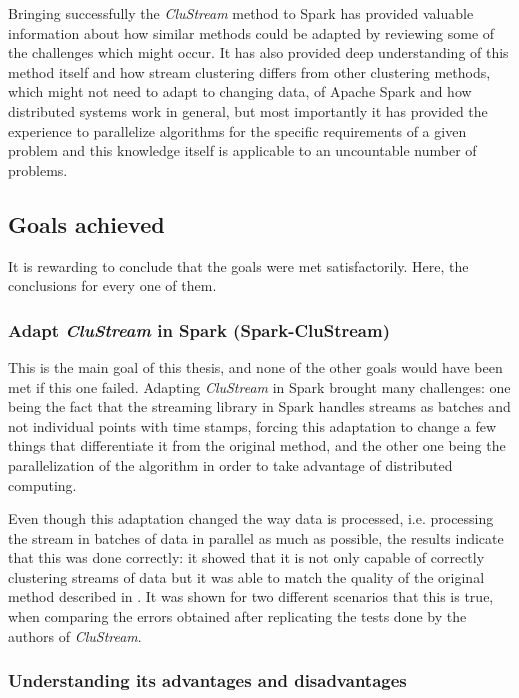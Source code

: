 Bringing successfully the \textit{CluStream} method to Spark has provided valuable information about how similar methods could be adapted by reviewing some of the challenges which might occur. It has also provided deep understanding of this method itself and how stream clustering differs from other clustering methods, which might not need to adapt to changing data, of Apache Spark and how distributed systems work in general, but most importantly it has provided the experience to parallelize algorithms for the specific requirements of a given problem and this knowledge itself is applicable to an uncountable number of problems.


\subsection{Goals achieved}

It is rewarding to conclude that the goals were met satisfactorily. Here, the conclusions for every one of them.

\subsubsection{Adapt \textit{CluStream} in Spark (Spark-CluStream)}

This is the main goal of this thesis, and none of the other goals would have been met if this one failed. Adapting \textit{CluStream} in Spark brought many challenges: one being the fact that the streaming library in Spark handles streams as batches and not individual points with time stamps, forcing this adaptation to change a few things that differentiate it from the original method, and the other one being the parallelization of the algorithm in order to take advantage of distributed computing.

Even though this adaptation changed the way data is processed, i.e. processing the stream in batches of data in parallel as much as possible, the results indicate that this was done correctly: it showed that it is not only capable of correctly clustering streams of data but it was able to match the quality of the original method described in \cite{clustreamOrig}. It was shown for two different scenarios that this is true, when comparing the errors obtained after replicating the tests done by the authors of \textit{CluStream}.

\subsubsection{Understanding its advantages and disadvantages}

